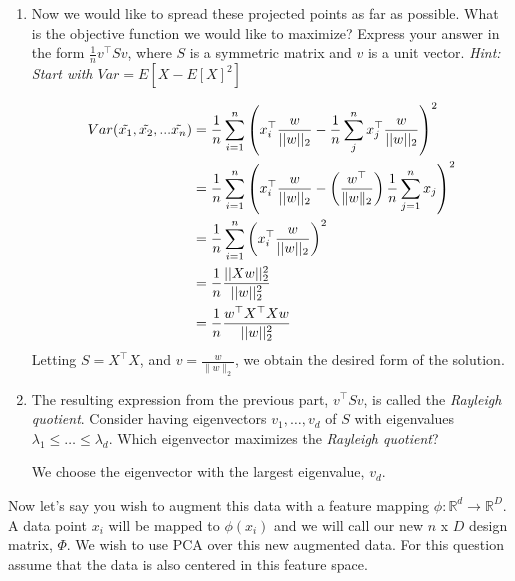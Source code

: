 \begin{Parts}
\begin{enumerate}
    \item Now we would like to spread these projected points as far as possible. What is the objective function we would like to maximize? Express your answer in the form $\frac{1}{n} v^{\top} S v$, where $S$ is a symmetric matrix and $v$ is a unit vector. \textit{Hint: Start with $Var = E[X - E[X]^2]$} 
    
    \begin{solution}
    \begin{align*}
        Var(\Tilde{x_1}, \Tilde{x_2}, ... \Tilde{x_n}) &= \frac{1}{n} \sum_{i = 1}^{n} \left(x_{i}^{\top} \frac{w}{||w||_2} - \frac{1}{n} \sum_{j}^{n} x_{j}^{\top} \frac{w}{||w||_2}\right)^2 \\
	&= \frac{1}{n} \sum_{i = 1}^{n} \left(x_{i}^{\top} \frac{w}{||w||_2} - \left(\frac{w^{\top}}{\|w\|_2}\right) \frac{1}{n} \sum_{j = 1}^{n} x_{j}\right)^2 \\
	&= \frac{1}{n} \sum_{i = 1}^{n} \left(x_{i}^{\top}\frac{w}{||w||_2}\right)^2 \\
	&= \frac{1}{n} \frac{||Xw||_2^2}{||w||_2^2} \\
	&= \frac{1}{n} \frac{w^{\top}X^{\top}Xw}{||w||_2^2}
    \end{align*}
    Letting $S = X^{\top}X$, and $v = \frac{w}{\|w\|_2}$, we obtain the desired form of the solution.
\end{solution}
    
    \item The resulting expression from the previous part, $v^{\top} S v$, is called the \textit{Rayleigh quotient}. Consider having eigenvectors $v_1, \dots, v_d$ of $S$ with eigenvalues $\lambda_1 \leq \dots \leq \lambda_d$. Which eigenvector maximizes the \textit{Rayleigh quotient}? %
    
    \begin{solution}
        We choose the eigenvector with the largest eigenvalue, $v_d$.
\end{solution}
    
\end{enumerate}
\Part Now let's say you wish to augment this data with a feature mapping $\phi:\mathbb{R}^d\xrightarrow{}\mathbb{R}^D$. A data point $x_i$ will be mapped to $\phi(x_i)$ and we will call our new $n$ x $D$ design matrix, $\Phi$. We wish to use PCA over this new augmented data. For this question assume that the data is also centered in this feature space.


\end{Parts}
